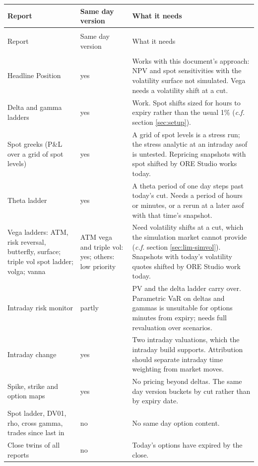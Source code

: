 \documentclass[12pt, a4paper]{article}
\begin{document}
{\small
\begin{longtable}{|>{\raggedright\arraybackslash}p{3.6cm}|>{\raggedright\arraybackslash}p{1.6cm}|>{\raggedright\arraybackslash}p{8.0cm}|}
\hline
Report & Same day version & What it needs \\
\hline
\endfirsthead
\multicolumn{3}{l}{\textit{Table \ref{tab:reports}, continued}} \\
\hline
Report & Same day version & What it needs \\
\hline
\endhead
\multicolumn{3}{r}{\textit{continued on the next page}} \\
\endfoot
\endlastfoot
Headline Position & yes & Works with this document's approach: NPV and spot sensitivities with the volatility surface
not simulated. Vega needs a volatility shift at a cut. \\
\hline
Delta and gamma ladders & yes & Work. Spot shifts sized for hours to expiry rather than the usual 1\% (\textit{c.f.}
section \ref{sec:setup}). \\
\hline
Spot greeks (P\&L over a grid of spot levels) & yes & A grid of spot levels is a stress run; the stress analytic at
an intraday asof is untested. Repricing snapshots with spot shifted by ORE Studio works today. \\
\hline
Theta ladder & yes & A theta period of one day steps past today's cut. Needs a period of hours or minutes, or a
rerun at a later asof with that time's snapshot. \\
\hline
Vega ladders: ATM, risk reversal, butterfly, surface; triple vol spot ladder; volga; vanna & ATM vega and triple vol:
yes; others: low priority & Need volatility shifts at a cut, which the simulation market cannot provide (\textit{c.f.}
section \ref{sec:lim-simvol}). Snapshots with today's volatility quotes shifted by ORE Studio work today. \\
\hline
Intraday risk monitor & partly & PV and the delta ladder carry over. Parametric VaR on deltas and gammas is unsuitable
for options minutes from expiry; needs full revaluation over scenarios. \\
\hline
Intraday change & yes & Two intraday valuations, which the intraday build supports. Attribution should separate
intraday time weighting from market moves. \\
\hline
Spike, strike and option maps & yes & No pricing beyond deltas. The same day version buckets by cut rather than by
expiry date. \\
\hline
Spot ladder, DV01, rho, cross gamma, trades since last in & no & No same day option content. \\
\hline
Close twins of all reports & no & Today's options have expired by the close. \\
\hline
\end{longtable}
}
\vspace{-1.5em}
\begin{center}
\label{tab:reports}
\end{center}
\end{document}
